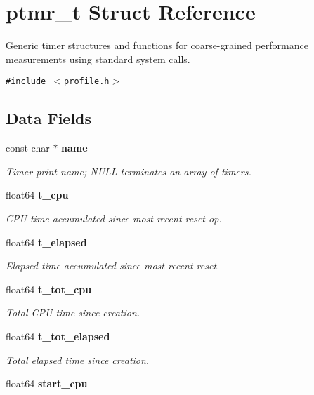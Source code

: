 \section{ptmr\_\-t Struct Reference}
\label{structptmr__t}
Generic timer structures and functions for coarse-grained performance measurements using standard system calls.  


{\tt \#include $<$profile.h$>$}

\subsection*{Data Fields}
\begin{CompactItemize}
\item 
const char $\ast$ {\bf name}
\begin{CompactList}\small\item\em Timer print name; NULL terminates an array of timers. \item\end{CompactList}\item 
float64 {\bf t\_\-cpu}\label{structptmr__t_cbd784f7332329999925d396deae3a5d}

\begin{CompactList}\small\item\em CPU time accumulated since most recent reset op. \item\end{CompactList}\item 
float64 {\bf t\_\-elapsed}\label{structptmr__t_743fce329d82fd7a9130cba5bbccd991}

\begin{CompactList}\small\item\em Elapsed time accumulated since most recent reset. \item\end{CompactList}\item 
float64 {\bf t\_\-tot\_\-cpu}\label{structptmr__t_301d13acc21718143b8b39b7af8b6677}

\begin{CompactList}\small\item\em Total CPU time since creation. \item\end{CompactList}\item 
float64 {\bf t\_\-tot\_\-elapsed}\label{structptmr__t_2dc87aa035c8eb542279ca4496dd76f1}

\begin{CompactList}\small\item\em Total elapsed time since creation. \item\end{CompactList}\item 
float64 {\bf start\_\-cpu}\label{structptmr__t_85c0c5f0e321cf11fb478b92a05223e8}


\end{CompactItemize}
